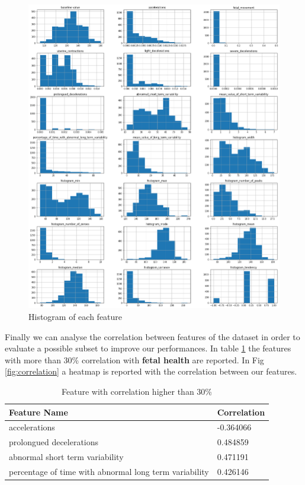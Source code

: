 \documentclass[a4paper,12pt]{article}
\begin{document}
\begin{figure}[H]
  \begin{center}
  \includegraphics[width=1.0\textwidth]{images/hist.png}
  \end{center}
  \caption{Histogram of each feature}
  \label{fig:hist}
\end{figure}

\bigbreak
\noindent Finally we can analyse the correlation between features of the dataset in order to evaluate a possible subset to improve our performances. In table \ref{tab:correlation} the features with more than 30\% correlation with \textbf{fetal health} are reported.
In Fig \ref{fig:correlation} a heatmap is reported with the correlation between our features.

\begin{table}[H]
\begin{tabular}{ |p{10cm}||p{3cm}| }
  \hline
  Feature Name& Correlation \\
  \hline
  accelerations&                                            -0.364066\\
  prolongued decelerations&                                  0.484859\\
  abnormal short term variability&                           0.471191\\
  percentage of time with abnormal long term variability&    0.426146\\
  \hline
\end{tabular}
\caption{Feature with correlation higher than 30\%}
\label{tab:correlation}
\end{table}
\end{document}
